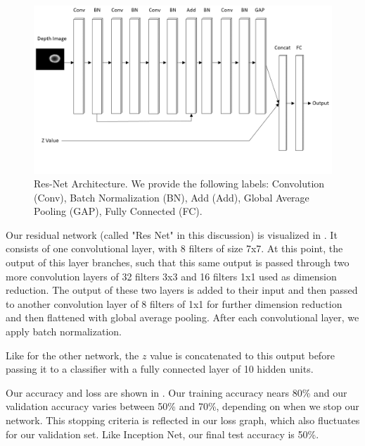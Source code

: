 \begin{figure}[t!]
    \includegraphics[width=0.99\columnwidth]{figs/res_net.png}
\caption{Res-Net Architecture. We provide the following labels: Convolution (Conv), Batch Normalization (BN), Add (Add), Global Average Pooling (GAP), Fully Connected (FC).} \label{fig:res_net}
\end{figure}

Our residual network (called "Res Net" in this discussion) is visualized in . 
It consists of one convolutional layer, with 8 filters of size 7x7.
At this point, the output of this layer branches, such that this same output is passed through two more convolution layers of 32 filters 3x3 and 16 filters 1x1 used as dimension reduction. 
The output of these two layers is added to their input and then passed to another convolution layer of 8 filters of 1x1 for further dimension reduction and then flattened with global average pooling. 
After each convolutional layer, we apply batch normalization. 

Like for the other network, the $z$ value is concatenated to this output before passing it to a classifier with a fully connected layer of 10 hidden units.

Our accuracy and loss are shown in . 
Our training accuracy nears 80\% and our validation accuracy varies between 50\% and 70\%, depending on when we stop our network. 
This stopping criteria is reflected in our loss graph, which also fluctuates for our validation set. 
Like Inception Net, our final test accuracy is 50\%. 

